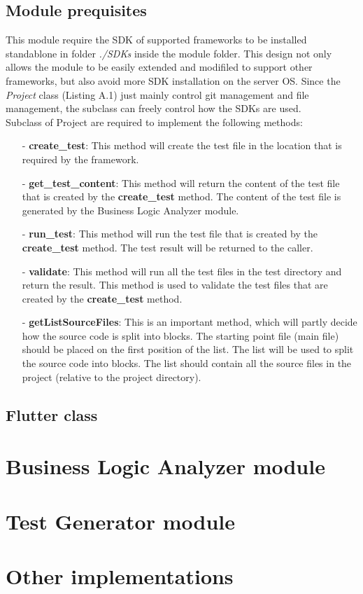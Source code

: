 \subsection{Module prequisites}
This module require the SDK of supported frameworks to be installed standablone in folder \textit{./SDKs} inside the module folder. This design not only allows the module to be easily extended and modifiled to support other frameworks, but also avoid more SDK installation on the server OS. Since the \textit{Project} class (Listing A.1) just mainly control git management and file management, the subclass can freely control how the SDKs are used. \\

Subclass of Project are required to implement the following methods:
    \begin{itemize}
        \item[-] \textbf{create\_test}: This method will create the test file in the location that is required by the framework.
        \item[-] \textbf{get\_test\_content}: This method will return the content of the test file that is created by the \textbf{create\_test} method. The content of the test file is generated by the Business Logic Analyzer module.
        \item[-] \textbf{run\_test}: This method will run the test file that is created by the \textbf{create\_test} method. The test result will be returned to the caller.
        \item[-] \textbf{validate}: This method will run all the test files in the test directory and return the result. This method is used to validate the test files that are created by the \textbf{create\_test} method.
        \item[-] \textbf{getListSourceFiles}: This is an important method, which will partly decide how the source code is split into blocks. The starting point file (main file) should be placed on the first position of the list. The list will be used to split the source code into blocks. The list should contain all the source files in the project (relative to the project directory).
    \end{itemize}


\subsection{Flutter class}



\section{Business Logic Analyzer module}

\section{Test Generator module}

\section{Other implementations}